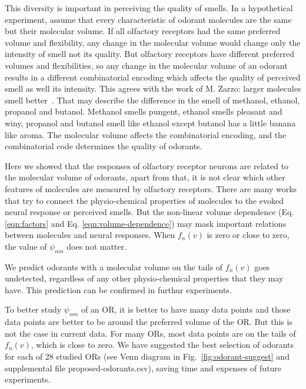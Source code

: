 \documentclass[11pt]{paper} %
\newcommand{\numberofreceptors}{ 28 }
\begin{document}
This diversity is important in perceiving the quality of smells. 
In a hypothetical experiment, 
assume that every characteristic of odorant molecules are the same but their molecular volume.
If all olfactory receptors had the same preferred volume and flexibility, 
any change in the molecular volume would change only the intensity of smell not its quality.
But olfactory receptors have different preferred volumes and flexibilities, 
so any change in the molecular volume of an odorant results in a different combinatorial encoding which affects the quality of perceived smell as well its intensity.
This agrees with the work of M. Zarzo: larger molecules  smell better~\cite{zarzo2011}.
That may describe the difference in the smell of methanol, ethanol, propanol and butanol. 
Methanol smells pungent, ethanol smells pleasant and winy, propanol and butanol smell like ethanol except butanol  has a little banana like aroma.
The molecular volume affects the combinatorial encoding, 
and the combinatorial code determines the quality of odorants.

Here we showed that the responses of olfactory receptor neurons are related to the molecular volume of odorants, 
apart from that, it is not clear which other features of molecules are measured by olfactory receptors. 
There are many works that try to connect the physio-chemical properties of molecules to the evoked neural response or perceived smells.
But the non-linear volume dependence (Eq. \ref{eqn:factors} and Eq. \ref{eqn:volume-dependence})  
may mask important relations between molecules and neural responses.
When $f_n(v)$ is zero or close to zero, 
the value of $\psi_{nm}$ does not matter. 

We predict odorants with a molecular volume on the tails of $f_n(v)$ goes undetected, 
regardless of any other physio-chemical properties that they may have. 
This prediction can be confirmed in furthur experiments. 

To better study $\psi_{nm}$ of an OR, 
it is better to have many data points and those data points are better to be around the preferred volume of the OR.
But this is not the case in current data. 
For many ORs, 
most data points are on the tails of $f_n(v)$, which is close to zero.
We have suggested the best selection of odorants for each of \numberofreceptors studied ORs 
(see Venn diagram in Fig.~\ref{fig:odorant-suggest} and supplemental file proposed-odorants.csv), 
saving time and expenses of future experiments. 

\end{document}
